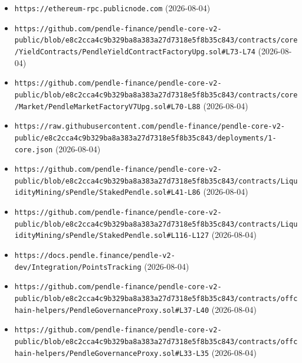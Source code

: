 \begin{itemize}
\item \texttt{https://ethereum-rpc.publicnode.com} (2026-08-04)
\item \texttt{https://github.com/pendle-finance/pendle-core-v2-public/blob/e8c2cca4c9b329ba8a383a27d7318e5f8b35c843/contracts/core/YieldContracts/PendleYieldContractFactoryUpg.sol\#L73-L74} (2026-08-04)
\item \texttt{https://github.com/pendle-finance/pendle-core-v2-public/blob/e8c2cca4c9b329ba8a383a27d7318e5f8b35c843/contracts/core/Market/PendleMarketFactoryV7Upg.sol\#L70-L88} (2026-08-04)
\item \texttt{https://raw.githubusercontent.com/pendle-finance/pendle-core-v2-public/e8c2cca4c9b329ba8a383a27d7318e5f8b35c843/deployments/1-core.json} (2026-08-04)
\item \texttt{https://github.com/pendle-finance/pendle-core-v2-public/blob/e8c2cca4c9b329ba8a383a27d7318e5f8b35c843/contracts/LiquidityMining/sPendle/StakedPendle.sol\#L41-L86} (2026-08-04)
\item \texttt{https://github.com/pendle-finance/pendle-core-v2-public/blob/e8c2cca4c9b329ba8a383a27d7318e5f8b35c843/contracts/LiquidityMining/sPendle/StakedPendle.sol\#L116-L127} (2026-08-04)
\item \texttt{https://docs.pendle.finance/pendle-v2-dev/Integration/PointsTracking} (2026-08-04)
\item \texttt{https://github.com/pendle-finance/pendle-core-v2-public/blob/e8c2cca4c9b329ba8a383a27d7318e5f8b35c843/contracts/offchain-helpers/PendleGovernanceProxy.sol\#L37-L40} (2026-08-04)
\item \texttt{https://github.com/pendle-finance/pendle-core-v2-public/blob/e8c2cca4c9b329ba8a383a27d7318e5f8b35c843/contracts/offchain-helpers/PendleGovernanceProxy.sol\#L33-L35} (2026-08-04)
\end{itemize}

